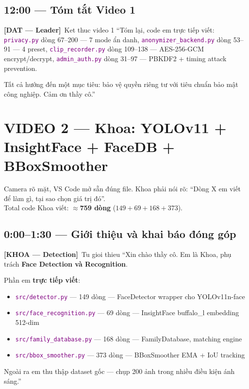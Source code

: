 \documentclass[12pt, a4paper]{article}
\newcommand{\dat}{\textcolor{BrickRed}{\textbf{[DAT --- Leader]}}}
\newcommand{\khoa}{\textcolor{OliveGreen}{\textbf{[KHOA --- Detection]}}}
\newcommand{\fpath}[1]{\texttt{\textcolor{purple}{#1}}}
\begin{document}
\subsection{12:00 --- Tóm tắt Video 1}

\begin{dialog}{\dat\ Ket thuc video 1}
``Tóm lại, code em trực tiếp viết:
\fpath{privacy.py} dòng 67--200 --- 7 mode ẩn danh,
\fpath{anonymizer\_backend.py} dòng 53--91 --- 4 preset,
\fpath{clip\_recorder.py} dòng 109--138 --- AES-256-GCM encrypt/decrypt,
\fpath{admin\_auth.py} dòng 31--97 --- PBKDF2 + timing attack prevention.

Tất cả hướng đến một mục tiêu: bảo vệ quyền riêng tư với tiêu chuẩn bảo mật công nghiệp.
Cảm ơn thầy cô.''
\end{dialog}

\newpage

\section{VIDEO 2 --- Khoa: YOLOv11 + InsightFace + FaceDB + BBoxSmoother}

\begin{tcolorbox}[colback=OliveGreen!6, colframe=OliveGreen,
  title={\textcolor{white}{\textbf{VIDEO 2 --- KHOA (Detection) --- YOLO + InsightFace + FaceDB}}}]
Camera rõ mặt, VS Code mở sẵn đúng file.
Khoa phải nói rõ: ``Dòng X em viết để làm gì, tại sao chọn giá trị đó''. \\
Total code Khoa viết: $\approx$\textbf{759 dòng} ($149 + 69 + 168 + 373$).
\end{tcolorbox}

\subsection{0:00--1:30 --- Giới thiệu và khai báo đóng góp}

\begin{dialog}{\khoa\ Tu gioi thieu}
``Xin chào thầy cô. Em là Khoa, phụ trách \textbf{Face Detection và Recognition}.

Phần em \textbf{trực tiếp viết}:
\begin{itemize}
  \item \fpath{src/detector.py} --- 149 dòng --- FaceDetector wrapper cho YOLOv11n-face
  \item \fpath{src/face\_recognition.py} --- 69 dòng --- InsightFace buffalo\_l embedding 512-dim
  \item \fpath{src/family\_database.py} --- 168 dòng --- FamilyDatabase, matching engine
  \item \fpath{src/bbox\_smoother.py} --- 373 dòng --- BBoxSmoother EMA + IoU tracking
\end{itemize}
Ngoài ra em thu thập dataset gốc --- chụp 200 ảnh trong nhiều điều kiện ánh sáng.''
\end{dialog}
\end{document}
